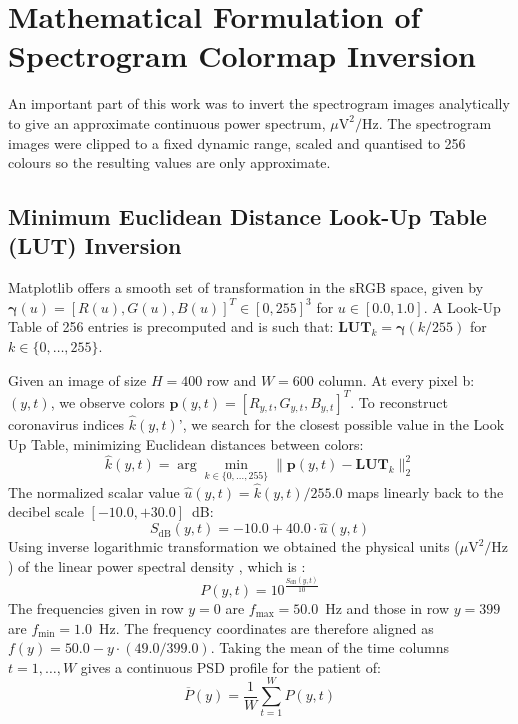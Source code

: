 \documentclass[12pt, a4paper]{report}
\begin{document}
\section{Mathematical Formulation of Spectrogram Colormap Inversion}
\label{sec:colormap_inversion}
An important part of this work was to invert the spectrogram images analytically to give an approximate continuous power spectrum, $\mu\text{V}^2/\text{Hz}$. The spectrogram images were clipped to a fixed dynamic range, scaled and quantised to 256 colours so the resulting values are only approximate.

\subsection{Minimum Euclidean Distance Look-Up Table (LUT) Inversion}
Matplotlib offers a smooth set of transformation in the sRGB space, given by $\boldsymbol{\gamma}(u) = [R(u), G(u), B(u)]^T \in [0, 255]^3$ for $u \in [0.0, 1.0]$. A Look-Up Table of 256 entries is precomputed and is such that: $\mathbf{LUT}_k = \boldsymbol{\gamma}(k/255)$ for $k \in \{0, \dots, 255\}$.



Given an image of size $H = 400$ row and $W = 600$ column. At every pixel b: $(y, t)$, we observe colors $\mathbf{p}(y, t) = [R_{y, t}, G_{y, t}, B_{y, t}]^T$. To reconstruct coronavirus indices $\hat{k}(y, t)$', we search for the closest possible value in the Look Up Table, minimizing Euclidean distances between colors:
\begin{equation}
    \hat{k}(y, t) = \arg\min_{k \in \{0, \dots, 255\}} \|\mathbf{p}(y, t) - \mathbf{LUT}_k\|_2^2
    \label{eq:lut_argmin}
\end{equation}
The normalized scalar value $\hat{u}(y, t) = \hat{k}(y, t) / 255.0$ maps linearly back to the decibel scale $[-10.0, +30.0]$~dB:
\begin{equation}
    S_{\text{dB}}(y, t) = -10.0 + 40.0 \cdot \hat{u}(y, t)
    \label{eq:db_reconstruction}
\end{equation}
Using inverse logarithmic transformation we obtained the physical units ($\mu\text{V}^2/\text{Hz}$) of the linear power spectral density , which is :
\begin{equation}
    P(y, t) = 10^{\frac{S_{\text{dB}}(y, t)}{10}}
    \label{eq:linear_power}
\end{equation}
The frequencies given in row $y = 0$ are $f_{\max} = 50.0$~Hz and those in row $y = 399$ are $f_{\min} = 1.0$~Hz. The frequency coordinates are therefore aligned as $f(y) = 50.0 - y \cdot (49.0 / 399.0)$. Taking the mean of the time columns $t = 1, \dots, W$ gives a continuous PSD profile for the patient of:
\begin{equation}
    \overline{P}(y) = \frac{1}{W} \sum_{t=1}^W P(y, t)
    \label{eq:psd_profile}
\end{equation}
\end{document}
